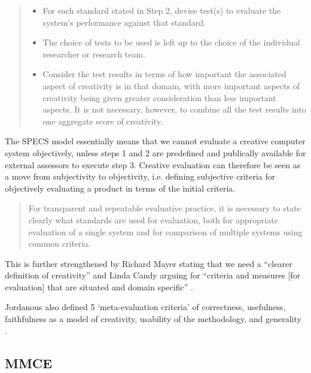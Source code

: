 \begin{quotation}
\begin{enumerate}
      \begin{itemize}
        \item For each standard stated in Step 2, devise test(s) to evaluate the system's performance against that standard.
        \item The choice of tests to be used is left up to the choice of the individual researcher or research team.
        \item Consider the test results in terms of how important the associated aspect of creativity is in that domain, with more important aspects of creativity being given greater consideration than less important aspects. It is not necessary, however, to combine all the test results into one aggregate score of creativity.
      \end{itemize}
  \end{enumerate}
\end{quotation}

The \ac{SPECS} model essentially means that we cannot evaluate a creative computer system objectively, unless steps 1 and 2 are predefined and publically available for external assessors to execute step 3. Creative evaluation can therefore be seen as a move from subjectivity to objectivity, i.e. defining subjective criteria for objectively evaluating a product in terms of the initial criteria.

\begin{quotation}
  For transparent and repeatable evaluative practice, it is necessary to state clearly what standards are used for evaluation, both for appropriate evaluation of a single system and for comparison of multiple systems using common criteria. 
\end{quotation}

This is further strengthened by Richard Mayer stating that we need a ``clearer definition of creativity'' \autocite*{Mayer1999} and Linda Candy arguing for ``criteria and measures [for evaluation] that are situated and domain specific'' \autocite*{Candy2012}.

Jordanous also defined 5 `meta-evaluation criteria' of correctness, usefulness, faithfulness as a model of creativity, usability of the methodology, and generality \autocite*{Jordanous2014}.


\subsection{MMCE}
\label{s:mmce}

